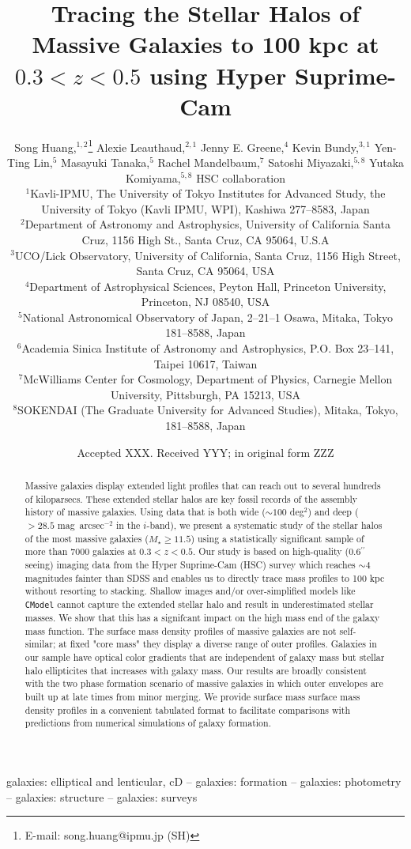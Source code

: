 \documentclass[a4paper,fleqn,usenatbib]{mnras}
\title[Mass Dependent Stellar Halo in Massive Galaxies]{Tracing the Stellar Halos of 
	   Massive Galaxies to 100 kpc at $0.3<z<0.5$ using Hyper Suprime-Cam}
\author[S. Huang et al.]{
        Song Huang,$^{1,2}$\thanks{E-mail: song.huang@ipmu.jp (SH)}
        Alexie Leauthaud,$^{2,1}$
        Jenny E. Greene,$^{4}$
        Kevin Bundy,$^{3,1}$
        \newauthor
        Yen-Ting Lin,$^{5}$
        Masayuki Tanaka,$^{5}$
        Rachel Mandelbaum,$^{7}$
        Satoshi Miyazaki,$^{5,8}$
        \newauthor
        Yutaka Komiyama,$^{5,8}$
        HSC collaboration 
        \\
        $^{1}$Kavli-IPMU, The University of Tokyo Institutes for Advanced Study, 
              the University of Tokyo (Kavli IPMU, WPI), Kashiwa 277--8583, Japan\\
        $^{2}$Department of Astronomy and Astrophysics, University of California 
              Santa Cruz, 1156 High St., Santa Cruz, CA 95064, U.S.A\\
        $^{3}$UCO/Lick Observatory, University of California, Santa Cruz,
              1156 High Street, Santa Cruz, CA 95064, USA\\
        $^{4}$Department of Astrophysical Sciences, Peyton Hall,
              Princeton University, Princeton, NJ 08540, USA \\
        $^{5}$National Astronomical Observatory of Japan, 2--21--1 Osawa, Mitaka, 
              Tokyo 181--8588, Japan\\
        $^{6}$Academia Sinica Institute of Astronomy and Astrophysics, 
              P.O. Box 23--141, Taipei 10617, Taiwan\\
        $^{7}$McWilliams Center for Cosmology, Department of Physics, 
              Carnegie Mellon University, Pittsburgh, PA 15213, USA\\
        $^{8}$SOKENDAI (The Graduate University for Advanced Studies), Mitaka,
              Tokyo, 181--8588, Japan
        }
\date{Accepted XXX. Received YYY; in original form ZZZ}
\def\asec{$^{\prime\prime}$}
\def\sb{mag~arcsec$^{-2}$}
\def\mstar{{$M_{\star}$}}
\begin{document}
\label{firstpage}
\pagerange{\pageref{firstpage}--\pageref{lastpage}}

\maketitle


\begin{abstract} Massive galaxies display extended light profiles that can reach out to several hundreds of kiloparsecs. These extended stellar halos are key fossil records of the assembly history of massive galaxies.  Using data that is both wide (${\sim}100$ deg$^2$) and deep ($>28.5$ \sb{} in the $i$-band), we  present a systematic study of the stellar halos of the most massive galaxies (\mstar{}$\geq 11.5$) using a statistically significant sample of more than $7000$ galaxies at $0.3 < z < 0.5$. Our  study is based on high-quality (0.6\asec seeing) imaging data from the Hyper Suprime-Cam (HSC) survey which reaches ${\sim}4$ magnitudes fainter than SDSS and  enables us to directly trace mass profiles to 100 kpc without resorting to stacking. Shallow images and/or over-simplified models like \texttt{CModel} cannot capture the extended stellar halo and result in underestimated stellar masses. We show that this has a signifcant impact on  the high mass end of the galaxy mass function. The surface mass density profiles of massive galaxies are not self-similar; at fixed "core mass" they display a diverse  range of outer profiles. Galaxies in our sample have optical color gradients that are independent of galaxy mass but stellar halo ellipticites that increases with galaxy mass. Our results are broadly consistent with the two phase formation scenario of massive galaxies in which outer envelopes are built up at late times from minor merging. We provide surface mass surface mass density profiles in a convenient tabulated format to facilitate comparisons with predictions from numerical simulations of galaxy formation.\end{abstract}

 


\begin{keywords}
    galaxies: elliptical and lenticular, cD --
    galaxies: formation --
    galaxies: photometry -- 
    galaxies: structure -- 
    galaxies: surveys
\end{keywords}
\end{document}
